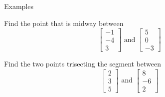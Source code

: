 \documentclass{beamer}
\begin{document}
\begin{frame}{Examples}
  \begin{example}
    Find the point that is midway between
    \begin{equation*}
      \left[
	\begin{array}{c}
          -1\\
          -4\\
          3
	\end{array}
      \right]\text{ and }
      \left[
	\begin{array}{c}
          5\\
          0\\
          -3
	\end{array}
      \right]
    \end{equation*}
  \end{example}
  \begin{example}
    Find the two points trisecting the segment between
    \begin{equation*}
      \left[
	\begin{array}{c}
          2\\
          3\\
          5
	\end{array}
      \right]\text{ and }
      \left[
	\begin{array}{c}
          8\\
          -6\\
          2
	\end{array}
      \right]
    \end{equation*}
  \end{example}
\end{frame}
\end{document}

